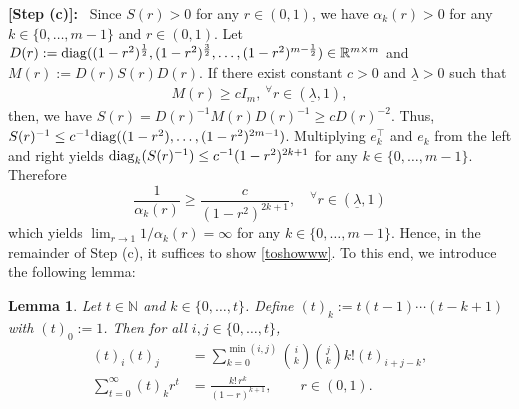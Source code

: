 \documentclass[preprint,5p,times,twocolumn]{elsarticle}
\newtheorem{lem}{Lemma}
\begin{document}
{\bf [Step (c)]:}~ Since $S(r) > 0$ for any $r \in (0,1)$, we have $\alpha_k(r) > 0$ for any $k \in \{0, \ldots, m-1\}$ and $r \in (0,1)$. Let $D(r) := {\rm diag}((1-r^2)^{\frac{1}{2}}, (1-r^2)^{\frac{3}{2}}, \ldots, (1-r^2)^{m-\frac{1}{2}}) \in \mathbb R^{m \times m}$ and $M(r) := D(r)S(r)D(r)$. If there exist constant $c>0$ and $\underline{\lambda}>0$ such that 
\begin{align}
 M(r) \geq c I_m, ~^\forall r\in(\underline{\lambda}, 1), \label{toshowww}
\end{align}
then, we have $S(r) = D(r)^{-1}M(r)D(r)^{-1} \geq c D(r)^{-2}$. Thus, $S(r)^{-1} \leq c^{-1} {\rm diag}((1-r^2), \ldots, (1-r^2)^{2m-1})$. Multiplying $e_k^{\top}$ and $e_k$ from the left and right yields ${\rm diag}_k(S(r)^{-1}) \leq c^{-1}(1-r^2)^{2k+1}$ for any $k \in \{0,\ldots,m-1\}$. Therefore
\[
 \frac{1}{\alpha_k(r)} \geq \frac{c}{(1-r^2)^{2k+1}}, \quad ^\forall r \in (\underline{\lambda},1)
\]
which yields $\lim_{r \to 1} 1/\alpha_k(r) = \infty$ for any $k \in \{0,\ldots,m-1\}$. Hence, in the remainder of Step (c), it suffices to show \eqref{toshowww}. To this end, we introduce the following lemma: 
\begin{lem}
Let $t\in\mathbb{N}$ and $k\in\{0,\dots,t\}$. Define $(t)_k:=t(t-1)\cdots(t-k+1)$ with $(t)_0:=1$. Then for all $i,j\in\{0,\dots,t\}$,
\begin{align}
(t)_i(t)_j &= \sum_{k=0}^{\min(i,j)} \binom{i}{k}\binom{j}{k}k!(t)_{i+j-k}, \label{falling-factorial-id} \\
\sum_{t=0}^{\infty} (t)_k r^t &= \frac{k!\,r^k}{(1-r)^{k+1}}, \qquad r\in(0,1).
\label{falling-factorial-genfun}
\end{align}
\end{lem}
\end{document}
